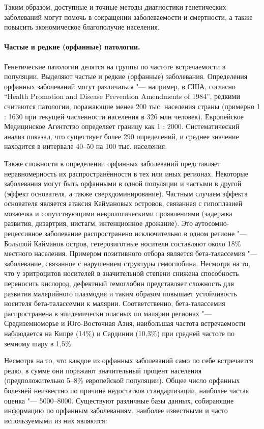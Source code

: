 \documentclass[a4paper,12pt]{article}
\begin{document}
Таким образом, доступные и точные методы диагностики генетических заболеваний могут помочь в сокращении заболеваемости и смертности, а также повысить экономическое благополучие населения.

\paragraph{Частые и редкие (орфанные) патологии.}
Генетические патологии делятся на группы по частоте встречаемости в популяции.
Выделяют частые и редкие (орфанные) заболевания.
Определения орфанных заболеваний могут различаться "--- например, в США, согласно ``Health Promotion and Disease Prevention Amendments of 1984'', редкими считаются патологии, поражающие менее 200 тыс. населения страны (примерно 1 : 1630 при текущей численности населения в 326 млн человек)\cite{herder}.
Европейское Медицинское Агентство определяет границу как 1 : 2000.
Систематический анализ показал, что существует более 290 определений, и среднее значение находится в интервале 40--50 на 100 тыс. населения\cite{richter}.

Также сложности в определении орфанных заболеваний представляет неравномерность их распространённости в тех или иных регионах.
Некоторые заболевания могут быть орфанными в одной популяции и частыми в другой (эффект основателя, а также сверхдоминирование).
Частным случаем эффекта основателя является атаксия Каймановых островов, связанная с гипоплазией мозжечка и сопутствующими неврологическими проявлениями (задержка развития, дизартрия, нистагм, интенционное дрожание).
Это аутосомно-рецессивное заболевание распространено исключительно в одном регионе "--- Большой Кайманов остров, гетерозиготные носители составляют около 18\% местного населения\cite{bomar}.
Примером позитивного отбора является бета-талассемия "--- заболевание, связанное с нарушением структуры гемоглобина.
Несмотря на то, что у эритроцитов носителей в значительной степени снижена способность переносить кислород, дефектный гемоглобин представляет сложность для развития малярийного плазмодия и таким образом повышает устойчивость носителя бета-талассемии к малярии\cite{galanello}.
Соответственно, бета-талассемия распространена в эпидемически опасных по малярии регионах "--- Средиземноморье и Юго-Восточная Азия, наибольшая частота встречаемости наблюдается на Кипре (14\%) и Сардинии (10,3\%) при средней частоте по земному шару в 1,5\%.

Несмотря на то, что каждое из орфанных заболеваний само по себе встречается редко, в сумме они поражают значительный процент населения (предположительно 5--8\% европейской популяции).
Общее число орфанных болезней неизвестно по причине недостатков стандартизации, наиболее частая оценка "--- 5000--8000\cite{lancet}.
Существуют различные базы данных, собирающие информацию по орфанным заболеваниям, наиболее известными и часто используемыми из них являются:
\end{document}
